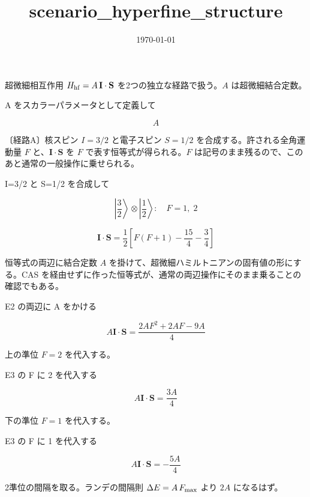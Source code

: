 \documentclass[dvipdfmx,a4paper,11pt]{jsarticle}
\title{scenario\_hyperfine\_structure}
\date{\today}
\begin{document}
\maketitle

超微細相互作用 $H_{\rm hf}=A\,\mathbf I\cdot\mathbf S$ を2つの独立な経路で扱う。$A$ は超微細結合定数。

A をスカラーパラメータとして定義して

\[
  A
\]

〔経路A〕核スピン $I=3/2$ と電子スピン $S=1/2$ を合成する。許される全角運動量 $F$ と、$\mathbf I\cdot\mathbf S$ を $F$ で表す恒等式が得られる。$F$ は記号のまま残るので、このあと通常の一般操作に乗せられる。

I=3/2 と S=1/2 を合成して

\begin{equation}
  \left| \frac{3}{2} \right\rangle \otimes \left| \frac{1}{2} \right\rangle:\quad F = 1,\; 2
  \label{eq:E1}
\end{equation}

\begin{equation}
  \mathbf{I}\cdot\mathbf{S} = \frac{1}{2}\left[ F(F+1) - \frac{15}{4} - \frac{3}{4} \right]
  \label{eq:E2}
\end{equation}

恒等式の両辺に結合定数 $A$ を掛けて、超微細ハミルトニアンの固有値の形にする。CAS を経由せずに作った恒等式が、通常の両辺操作にそのまま乗ることの確認でもある。

E2 の両辺に A をかける

\begin{equation}
  A \mathbf{I}\cdot\mathbf{S} = \frac{2 A F^2+2 A F-9 A}{4}
  \label{eq:E3}
\end{equation}

上の準位 $F=2$ を代入する。

E3 の F に 2 を代入する

\begin{equation}
  A \mathbf{I}\cdot\mathbf{S} = \frac{3 A}{4}
  \label{eq:E4}
\end{equation}

下の準位 $F=1$ を代入する。

E3 の F に 1 を代入する

\begin{equation}
  A \mathbf{I}\cdot\mathbf{S} = -\frac{5 A}{4}
  \label{eq:E5}
\end{equation}

2準位の間隔を取る。ランデの間隔則 $\Delta E = A\,F_{\rm max}$ より $2A$ になるはず。
\end{document}
